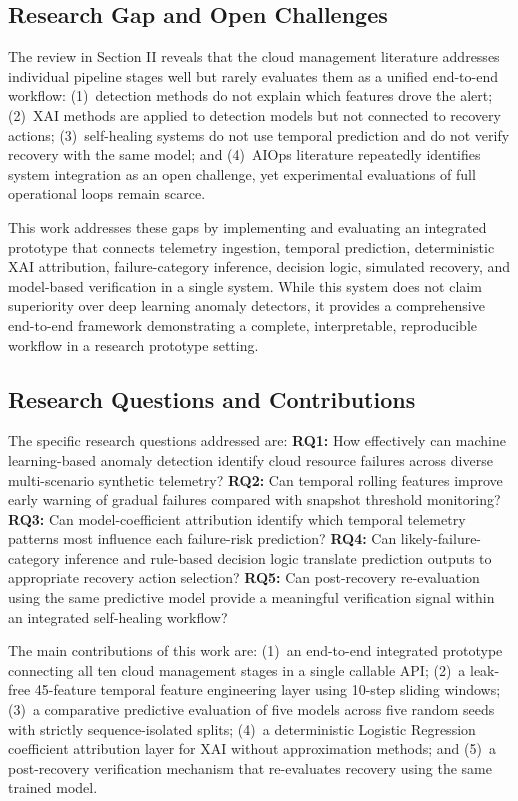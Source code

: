 \documentclass[conference]{IEEEtran}
\begin{document}
\subsection{Research Gap and Open Challenges}

The review in Section II reveals that the cloud management literature addresses individual pipeline stages well but rarely evaluates them as a unified end-to-end workflow: (1)~detection methods do not explain which features drove the alert; (2)~XAI methods are applied to detection models but not connected to recovery actions; (3)~self-healing systems do not use temporal prediction and do not verify recovery with the same model; and (4)~AIOps literature repeatedly identifies system integration as an open challenge, yet experimental evaluations of full operational loops remain scarce.

This work addresses these gaps by implementing and evaluating an integrated prototype that connects telemetry ingestion, temporal prediction, deterministic XAI attribution, failure-category inference, decision logic, simulated recovery, and model-based verification in a single system. While this system does not claim superiority over deep learning anomaly detectors, it provides a comprehensive end-to-end framework demonstrating a complete, interpretable, reproducible workflow in a research prototype setting.

\subsection{Research Questions and Contributions}

The specific research questions addressed are: \textbf{RQ1:} How effectively can machine learning-based anomaly detection identify cloud resource failures across diverse multi-scenario synthetic telemetry? \textbf{RQ2:} Can temporal rolling features improve early warning of gradual failures compared with snapshot threshold monitoring? \textbf{RQ3:} Can model-coefficient attribution identify which temporal telemetry patterns most influence each failure-risk prediction? \textbf{RQ4:} Can likely-failure-category inference and rule-based decision logic translate prediction outputs to appropriate recovery action selection? \textbf{RQ5:} Can post-recovery re-evaluation using the same predictive model provide a meaningful verification signal within an integrated self-healing workflow?

The main contributions of this work are: (1)~an end-to-end integrated prototype connecting all ten cloud management stages in a single callable API; (2)~a leak-free 45-feature temporal feature engineering layer using 10-step sliding windows; (3)~a comparative predictive evaluation of five models across five random seeds with strictly sequence-isolated splits; (4)~a deterministic Logistic Regression coefficient attribution layer for XAI without approximation methods; and (5)~a post-recovery verification mechanism that re-evaluates recovery using the same trained model.
\end{document}
